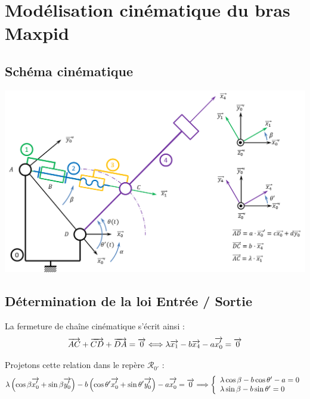 \documentclass[10pt,fleqn]{article} %
\begin{document}






\section{Modélisation cinématique du bras Maxpid}
\subsection{Schéma cinématique}


\begin{center}
 \includegraphics[width=.95\textwidth]{images/schema}
\end{center}

\subsection{Détermination de la loi Entrée / Sortie}

La fermeture de chaîne cinématique s'écrit ainsi : 
$$
\overrightarrow{AC}+\overrightarrow{CD}+\overrightarrow{DA}=\overrightarrow{0} 
\Longleftrightarrow
\lambda\overrightarrow{x_1} - b \overrightarrow{x_4} - a \overrightarrow{x_0'} = \overrightarrow{0}
$$

Projetons cette relation dans le repère $\mathcal{R}_{0'}$ :
$$
\lambda\left(\cos\beta \overrightarrow{x_0'}+\sin \beta \overrightarrow{y_0'} \right) 
- b \left(\cos\theta' \overrightarrow{x_0'}+\sin \theta' \overrightarrow{y_0'} \right) - a \overrightarrow{x_0'} = \overrightarrow{0}
\Longrightarrow 
\left\{
\begin{array}{l}
\lambda\cos\beta - b \cos\theta' - a  = 0 \\
\lambda\sin \beta - b \sin \theta' = 0
\end{array}
\right.
$$
\end{document}
